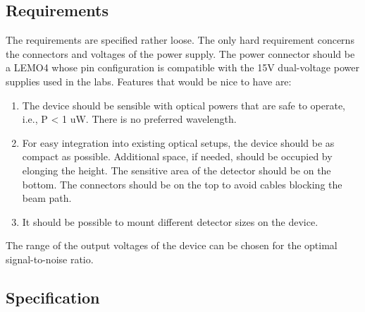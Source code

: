 \subsection{Requirements}

The requirements are specified rather loose. The only hard requirement concerns the connectors and voltages of the power supply. The power connector should be a LEMO4 whose pin configuration is compatible with the 15V dual-voltage power supplies used in the labs. Features that would be nice to have are:
\begin{enumerate}
	\item The device should be sensible with optical powers that are safe to operate, i.e., P < 1 uW. There is no preferred wavelength.
	\item For easy integration into existing optical setups, the device should be as compact as possible. Additional space, if needed, should be occupied by elonging the height. The sensitive area of the detector should be on the bottom. The connectors should be on the top to avoid cables blocking the beam path.
	\item It should be possible to mount different detector sizes on the device.
\end{enumerate}
The range of the output voltages of the device can be chosen for the optimal signal-to-noise ratio.

\subsection{Specification}


